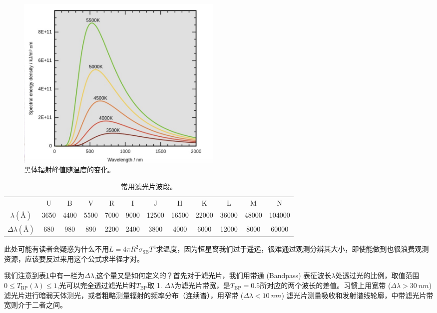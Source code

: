\documentclass[../天体物理基础.tex]{subfiles}
\begin{document}
\begin{figure}[!htbp]
\centering
\includegraphics[width=10cm]{figures/figure1_1.png}
\captionsetup{justification=raggedright, singlelinecheck=false}
\caption{黑体辐射峰值随温度的变化。}
\label{黑体辐射峰值随温度的变化。}
\end{figure}

\begin{table}[htbp]
\centering
\caption{常用滤光片波段。}
\begin{tabular}{c c c c c c c c c c c c}
\hline
 & U & B & V & R & I & J & H & K & L & M & N\\
\cline{1-12}
$\lambda\left(\si{\angstrom}\right)$ & 3650 & 4400 & 5500 & 7000 & 9000 & 12500 & 16500 & 22000 & 36000 & 48000 & 104000\\
\cline{1-12}
$\Delta{}\lambda\left(\si{\angstrom}\right)$ & 680 & 980 & 890 & 2200 & 2400 & 3800 & 4000 & 6000 & 12000 & 8000 & 60000\\
\cline{1-12}
\end{tabular}
\label{常用滤光片波段。}
\end{table}

此处可能有读者会疑惑为什么不用$L=4\pi R^{2}\sigma_{\text{SB}}T^{4}$求温度，因为恒星离我们过于遥远，很难通过观测分辨其大小，即使能做到也很浪费观测资源，应该要反过来用这个公式求半径才对。

我们注意到表\ref{常用滤光片波段。}中有一栏为$\Delta{}\lambda$,这个量又是如何定义的？首先对于滤光片，我们用带通 (Bandpass) 表征波长$\lambda$处透过光的比例，取值范围$0\le T_{\text{BP}}(\lambda)\le 1$,光可以完全透过滤光片时$T_{\text{BP}}$取 1. $\Delta\lambda$为滤光片带宽，是$T_{\text{BP}}=0.5$所对应的两个波长的差值。习惯上用宽带 ($\Delta\lambda>\qty{30}{nm}$) 滤光片进行暗弱天体测光，或者粗略测量辐射的频率分布（连续谱），用窄带 ($\Delta\lambda<\qty{10}{nm}$) 滤光片测量吸收和发射谱线轮廓，中带滤光片带宽则介于二者之间。
\end{document}
